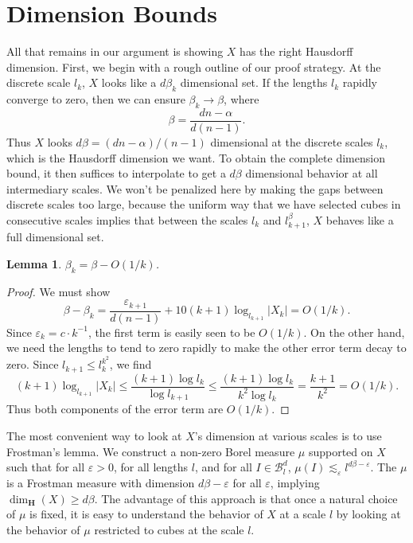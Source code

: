 \documentclass[usenames,dvipsnames]{article}
\theoremstyle{plain}
\newtheorem{lemma}{Lemma}
\theoremstyle{plain}
\begin{document}
\section{Dimension Bounds}

All that remains in our argument is showing $X$ has the right Hausdorff dimension. First, we begin with a rough outline of our proof strategy. At the discrete scale $l_k$, $X$ looks like a $d \beta_k$ dimensional set. If the lengths $l_k$ rapidly converge to zero, then we can ensure $\beta_k \to \beta$, where
%
\[ \beta = \frac{dn - \alpha}{d(n - 1)}. \]
%
Thus $X$ looks $d \beta = (dn - \alpha) / (n-1)$ dimensional at the discrete scales $l_k$, which is the Hausdorff dimension we want. To obtain the complete dimension bound, it then suffices to interpolate to get a $d\beta$ dimensional behavior at all intermediary scales. We won't be penalized here by making the gaps between discrete scales too large, because the uniform way that we have selected cubes in consecutive scales implies that between the scales $l_k$ and $l_{k+1}^\beta$, $X$ behaves like a full dimensional set.

\begin{lemma}
	$\beta_k = \beta - O(1/k)$.
\end{lemma}
\begin{proof}
	We must show
	\[ \beta - \beta_k = \frac{\varepsilon_{k+1}}{d(n-1)} + 10(k+1) \log_{l_{k+1}} |X_k| = O(1/k). \]
	Since $\varepsilon_k = c \cdot k^{-1}$, the first term is easily seen to be $O(1/k)$. On the other hand, we need the lengths to tend to zero rapidly to make the other error term decay to zero. Since $l_{k+1} \leq l_k^{k^2}$, we find
	\[ (k+1) \log_{l_{k+1}} |X_k| \leq \frac{(k+1) \log l_k}{\log l_{k+1}} \leq \frac{(k+1) \log l_k}{k^2 \log l_k} = \frac{k+1}{k^2} = O(1/k). \]
	Thus both components of the error term are $O(1/k)$.
\end{proof}

The most convenient way to look at $X$'s dimension at various scales is to use Frostman's lemma. We construct a non-zero Borel measure $\mu$ supported on $X$ such that for all $\varepsilon > 0$, for all lengths $l$, and for all $I \in \mathcal{B}^d_l$, $\mu(I) \lesssim_\varepsilon l^{d\beta - \varepsilon}$. The $\mu$ is a Frostman measure with dimension $d\beta - \varepsilon$ for all $\varepsilon$, implying $\dim_{\mathbf{H}}(X) \geq d \beta$. The advantage of this approach is that once a natural choice of $\mu$ is fixed, it is easy to understand the behavior of $X$ at a scale $l$ by looking at the behavior of $\mu$ restricted to cubes at the scale $l$.
\end{document}
